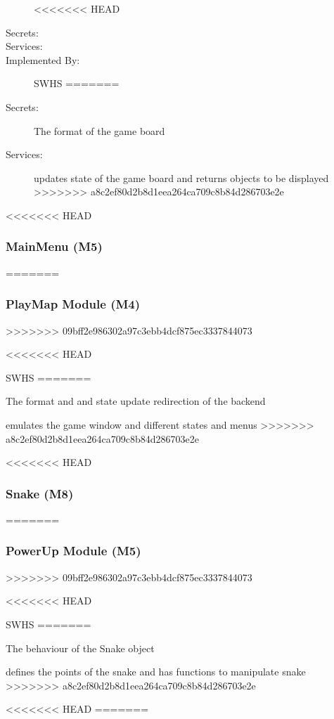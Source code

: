 \documentclass[12pt]{article}
\begin{document}
\begin{description}
<<<<<<< HEAD
\item[Secrets:] 
\item[Services:] 
\item[Implemented By:] SWHS
=======
\item[Secrets:] The format of the game board
\item[Services:] updates state of the game board and returns objects to be displayed
>>>>>>> a8c2ef80d2b8d1eea264ca709c8b84d286703e2e
\end{description} 

<<<<<<< HEAD
\subsubsection{MainMenu (M5)}
=======
\subsubsection{PlayMap Module (M4)}
>>>>>>> 09bff2e986302a97c3ebb4dcf875ec3337844073

\begin{description}
<<<<<<< HEAD
\item[Secrets:] 
\item[Services:] 
\item[Implemented By:] SWHS
=======
\item[Secrets:] The format and and state update redirection of the backend
\item[Services:] emulates the game window and different states and menus
>>>>>>> a8c2ef80d2b8d1eea264ca709c8b84d286703e2e
\end{description} 

<<<<<<< HEAD
\subsubsection{Snake (M8)}
=======
\subsubsection{PowerUp Module (M5)}
>>>>>>> 09bff2e986302a97c3ebb4dcf875ec3337844073

\begin{description}
<<<<<<< HEAD
\item[Secrets:] 
\item[Services:] 
\item[Implemented By:] SWHS
=======
\item[Secrets:] The behaviour of the Snake object
\item[Services:] defines the points of the snake and has functions to manipulate snake
>>>>>>> a8c2ef80d2b8d1eea264ca709c8b84d286703e2e
\end{description} 
<<<<<<< HEAD
=======
 
\end{document}
